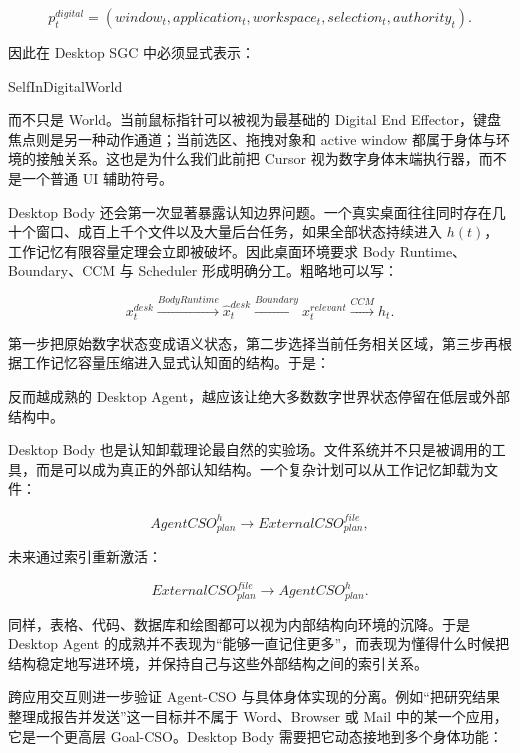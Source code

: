 $$
p_t^{digital}
=
(
window_t,
application_t,
workspace_t,
selection_t,
authority_t
).
$$

因此在 Desktop SGC 中必须显式表示：

\begin{statementbox}
SelfInDigitalWorld
\end{statementbox}

而不只是 World。当前鼠标指针可以被视为最基础的 Digital End Effector，键盘焦点则是另一种动作通道；当前选区、拖拽对象和 active window 都属于身体与环境的接触关系。这也是为什么我们此前把 Cursor 视为数字身体末端执行器，而不是一个普通 UI 辅助符号。

Desktop Body 还会第一次显著暴露认知边界问题。一个真实桌面往往同时存在几十个窗口、成百上千个文件以及大量后台任务，如果全部状态持续进入 $h(t)$，工作记忆有限容量定理会立即被破坏。因此桌面环境要求 Body Runtime、Boundary、CCM 与 Scheduler 形成明确分工。粗略地可以写：

$$
x_t^{desk}
\xrightarrow{BodyRuntime}
\hat x_t^{desk}
\xrightarrow{Boundary}
x_t^{relevant}
\xrightarrow{CCM}
h_t.
$$

第一步把原始数字状态变成语义状态，第二步选择当前任务相关区域，第三步再根据工作记忆容量压缩进入显式认知面的结构。于是：

\begin{statementbox}
\centering
{}
\end{statementbox}

反而越成熟的 Desktop Agent，越应该让绝大多数数字世界状态停留在低层或外部结构中。

Desktop Body 也是认知卸载理论最自然的实验场。文件系统并不只是被调用的工具，而是可以成为真正的外部认知结构。一个复杂计划可以从工作记忆卸载为文件：

$$
AgentCSO_{plan}^{h}
\rightarrow
ExternalCSO_{plan}^{file},
$$

未来通过索引重新激活：

$$
ExternalCSO_{plan}^{file}
\rightarrow
AgentCSO_{plan}^{h}.
$$

同样，表格、代码、数据库和绘图都可以视为内部结构向环境的沉降。于是 Desktop Agent 的成熟并不表现为“能够一直记住更多”，而表现为懂得什么时候把结构稳定地写进环境，并保持自己与这些外部结构之间的索引关系。

跨应用交互则进一步验证 Agent-CSO 与具体身体实现的分离。例如“把研究结果整理成报告并发送”这一目标并不属于 Word、Browser 或 Mail 中的某一个应用，它是一个更高层 Goal-CSO。Desktop Body 需要把它动态接地到多个身体功能：

